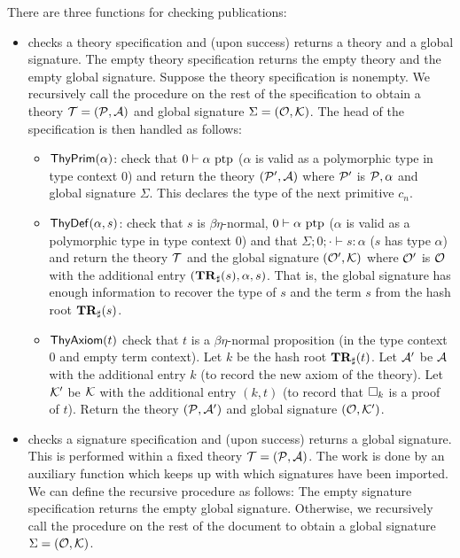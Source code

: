 There are three functions for checking publications:
\begin{itemize}
\item {} checks a theory specification
and (upon success) returns a theory and a global signature.
The empty theory specification returns the empty theory and the empty global signature.
Suppose the theory specification is nonempty. 
We recursively call the procedure on the rest of the specification to obtain a theory
$\mathcal{T} = (\mathcal{P},\mathcal{A})$
and global signature
$\Sigma = (\mathcal{O},\mathcal{K})$.
The head of the specification is then handled as follows:
\begin{itemize}
\item $\mbox{\constr{ThyPrim}}(\alpha)$: check that $0\vdash \alpha~\mbox{ptp}$ ($\alpha$ is valid
as a polymorphic type in type context $0$)
and return the theory $(\mathcal{P}',\mathcal{A})$ where $\mathcal{P}'$ is $\mathcal{P},\alpha$
and global signature $\Sigma$.
This declares the type of the next primitive $c_n$.
\item $\mbox{\constr{ThyDef}}(\alpha,s)$: check that $s$ is $\beta\eta$-normal,
$0\vdash \alpha~\mbox{ptp}$ ($\alpha$ is valid
as a polymorphic type in type context $0$)
and that $\Sigma;0;\cdot\vdash s:\alpha$ ($s$ has type $\alpha$)
and return the theory $\mathcal{T}$ and the global signature
$(\mathcal{O}',\mathcal{K})$ where $\mathcal{O}'$ is $\mathcal{O}$ with the additional entry $(\mathbf{TR}_{\sharp}(s),\alpha,s)$.
That is, the global signature has enough information to recover the type of $s$
and the term $s$ from the hash root $\mathbf{TR}_{\sharp}(s)$.
\item $\mbox{\constr{ThyAxiom}}(t)$ check that $t$ is a $\beta\eta$-normal
proposition (in the type context $0$ and empty term context).
Let $k$ be the hash root $\mathbf{TR}_{\sharp}(t)$.
Let $\mathcal{A}'$ be $\mathcal{A}$ with the additional entry $k$ (to record the new axiom of the theory).
Let $\mathcal{K}'$ be $\mathcal{K}$ with the additional entry $(k,t)$ (to record that $\Box_{k}$ is a proof of $t$).
Return the theory $(\mathcal{P},\mathcal{A}')$ and global signature $(\mathcal{O},\mathcal{K}')$.
\end{itemize}
\item {} checks a signature specification
and (upon success) returns a global signature.
This is performed within a fixed theory $\mathcal{T} = (\mathcal{P},\mathcal{A})$.
The work is done by an auxiliary function {}
which keeps up with which signatures have been imported.
We can define the recursive procedure as follows:
The empty signature specification returns the empty global signature.
Otherwise, we recursively call the procedure on the rest of the document
to obtain a global signature $\Sigma = (\mathcal{O},\mathcal{K})$.

\end{itemize}
